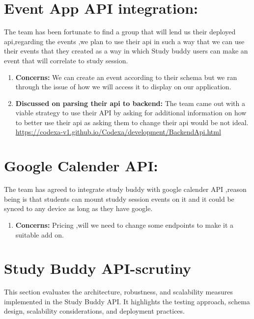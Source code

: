 \section{Event App API integration:}
The team has been fortunate to find a group that will lend us their deployed api,regarding the events ,we plan to use their api in such a way that we can use their events that they created as a way in which Study buddy users can make an event that will correlate to study session.
\begin{enumerate}
    \item \textbf{Concerns:} We can create an event according to their schema but we ran through the issue of how we will access it to display on our application.
    \item \textbf{Discussed on parsing their api to backend:} The team came out with a viable strategy to use their API by asking for additional information on how to better use their api as asking them to change their api would be not ideal.
    \url {https://codexa-v1.github.io/Codexa/development/BackendApi.html}
\end{enumerate}

\section{Google Calender API:}
The team has agreed to integrate study buddy with google calender API ,reason being is that students can mount studdy session events on it and it could be synced to any device as long as they have google.
\begin{enumerate}
    \item \textbf{Concerns:} Pricing ,will we need to change some endpoints to make it a suitable add on.
\end{enumerate}


\section{Study Buddy API-scrutiny}
This section evaluates the architecture, robustness, and scalability measures implemented in the Study Buddy API. It highlights the testing approach, schema design, scalability considerations, and deployment practices.

